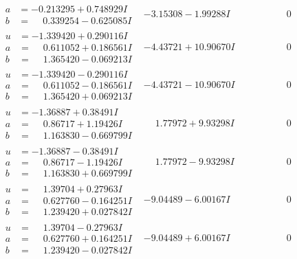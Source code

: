 \documentclass[1p]{elsarticle_modified}
\theoremstyle{definition}
\begin{document}
$$\begin{array}{c|c|c}
\begin{aligned}
a &= -0.213295 + 0.748929 I \\
b &= \phantom{-}0.339254 - 0.625085 I\end{aligned}
 & -3.15308 - 1.99288 I & \phantom{-0.000000 } 0 \\ \hline\begin{aligned}
u &= -1.339420 + 0.290116 I \\
a &= \phantom{-}0.611052 + 0.186561 I \\
b &= \phantom{-}1.365420 - 0.069213 I\end{aligned}
 & -4.43721 + 10.90670 I & \phantom{-0.000000 } 0 \\ \hline\begin{aligned}
u &= -1.339420 - 0.290116 I \\
a &= \phantom{-}0.611052 - 0.186561 I \\
b &= \phantom{-}1.365420 + 0.069213 I\end{aligned}
 & -4.43721 - 10.90670 I & \phantom{-0.000000 } 0 \\ \hline\begin{aligned}
u &= -1.36887 + 0.38491 I \\
a &= \phantom{-}0.86717 + 1.19426 I \\
b &= \phantom{-}1.163830 - 0.669799 I\end{aligned}
 & \phantom{-}1.77972 + 9.93298 I & \phantom{-0.000000 } 0 \\ \hline\begin{aligned}
u &= -1.36887 - 0.38491 I \\
a &= \phantom{-}0.86717 - 1.19426 I \\
b &= \phantom{-}1.163830 + 0.669799 I\end{aligned}
 & \phantom{-}1.77972 - 9.93298 I & \phantom{-0.000000 } 0 \\ \hline\begin{aligned}
u &= \phantom{-}1.39704 + 0.27963 I \\
a &= \phantom{-}0.627760 - 0.164251 I \\
b &= \phantom{-}1.239420 + 0.027842 I\end{aligned}
 & -9.04489 - 6.00167 I & \phantom{-0.000000 } 0 \\ \hline\begin{aligned}
u &= \phantom{-}1.39704 - 0.27963 I \\
a &= \phantom{-}0.627760 + 0.164251 I \\
b &= \phantom{-}1.239420 - 0.027842 I\end{aligned}
 & -9.04489 + 6.00167 I & \phantom{-0.000000 } 0\\

\end{array}$$
\end{document}

